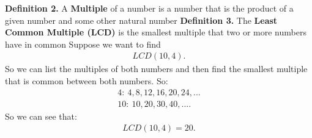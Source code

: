 \documentclass{report}
\begin{document}
   \bigbreak \noindent 
   \textbf{Definition 2.}  A \textbf{Multiple} of a number is a number that is the product of a given number and some other natural number
   \bigbreak \noindent 
   \textbf{Definition 3.} The \textbf{Least Common Multiple (LCD)} is the smallest multiple that two or more numbers have in common
   \bigbreak \noindent 
   Suppose we want to find
   \begin{align*}
       LCD(10,4)
   .\end{align*}
   \bigbreak \noindent 
   So we can list the multiples of both numbers and then find the smallest multiple that is common between both numbers. So:
   \begin{align*}
       4:\ 4,8,12,16,20,24,... \\
       10:\ 10,20,30,40,...
   .\end{align*}
   \bigbreak \noindent 
   So we can see that:
   \begin{align*}
       LCD(10,4) = 20
   .\end{align*}
\end{document}
